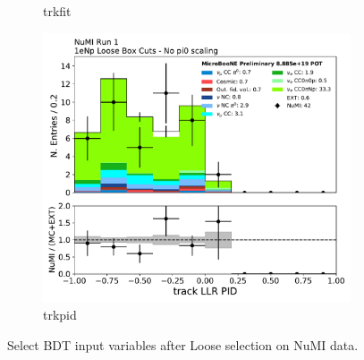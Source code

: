 \begin{figure}[H]
\begin{subfigure}{0.3\textwidth}
    \caption{trkfit}
    \end{subfigure}
    \begin{subfigure}{0.3\textwidth}
    \includegraphics[width=1.0\textwidth]{Sidebands/Figures/NuMI/1eNp/trkpid.pdf}
    \caption{trkpid}
    \end{subfigure}
    \caption{Select BDT input variables after \npsel Loose selection on NuMI data.} 
    \label{fig:NuMI_1eNp_0}
\end{figure}

